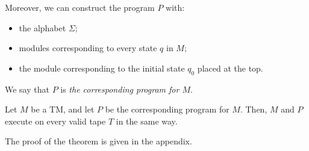 Moreover, we can construct the program $P$ with:
\begin{itemize}
    \item the alphabet $\Sigma$;
    \item modules corresponding to every state $q$ in $M$;
    \item the module corresponding to the initial state $q_0$ placed at the top.
\end{itemize}
We say that $P$ is \emph{the corresponding program for $M$}.

\begin{theorem}
    Let $M$ be a TM, and let $P$ be the corresponding program for $M$. Then, $M$ and $P$ execute on every valid tape $T$ in the same way. 
\end{theorem}
The proof of the theorem is given in the appendix.


